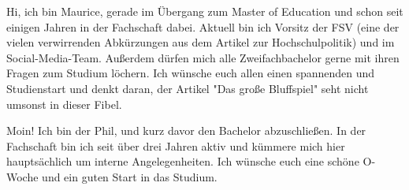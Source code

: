 \begin{multicols}{2}
{
Hi, ich bin Maurice, gerade im Übergang zum Master of Education und schon seit einigen Jahren in der Fachschaft dabei. Aktuell bin ich Vorsitz der FSV (eine der vielen verwirrenden Abkürzungen aus dem Artikel zur Hochschulpolitik) und im Social-Media-Team. Außerdem dürfen mich alle Zweifachbachelor gerne mit ihren Fragen zum Studium löchern. Ich wünsche euch allen einen spannenden und Studienstart und denkt daran, der Artikel "Das große Bluffspiel" seht nicht umsonst in dieser Fibel.
}

\vspace{-0.8cm}

{
Moin! Ich bin der Phil, und kurz davor den Bachelor abzuschließen.
In der Fachschaft bin ich seit über drei Jahren aktiv und kümmere mich hier hauptsächlich um interne Angelegenheiten.
Ich wünsche euch eine schöne O-Woche und ein guten Start in das Studium.
}


\end{multicols}
